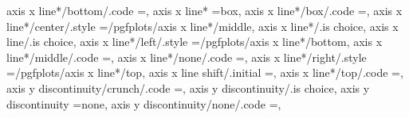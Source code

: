{{{{{{{{axis x line*/bottom/.code                                          ={\def\pgfplots@xaxislinesnum{1}\def\pgfplots@xtickposnum{1}\let\pgfplots@xticklabel@pos\pgfutil@empty},                            
axis x line*                                                       =box,                                                                                                                               
axis x line*/box/.code                                             ={\def\pgfplots@xaxislinesnum{0}\def\pgfplots@xtickposnum{0}},                                                                      
axis x line*/center/.style                                         ={/pgfplots/axis x line*/middle},                                                                                                   
axis x line*/.is choice,
axis x line/.is choice,
axis x line*/left/.style                                           ={/pgfplots/axis x line*/bottom},                                                                                                   
axis x line*/middle/.code                                          ={\def\pgfplots@xaxislinesnum{2}\def\pgfplots@xtickposnum{2}\let\pgfplots@xticklabel@pos\pgfutil@empty},                            
axis x line*/none/.code                                            ={\def\pgfplots@xaxislinesnum{4}\def\pgfplots@xtickposnum{4}\let\pgfplots@xticklabel@pos\pgfutil@empty},                            
axis x line*/right/.style                                          ={/pgfplots/axis x line*/top},                                                                                                      
axis x line shift/.initial                                         =,                                                                                                                                  
axis x line*/top/.code                                             ={\def\pgfplots@xaxislinesnum{3}\def\pgfplots@xtickposnum{3}\let\pgfplots@xticklabel@pos\pgfutil@empty},                            
axis y discontinuity/crunch/.code                                  ={\def\pgfplots@yaxisdiscontnum{1}},                                                                                                
axis y discontinuity/.is choice,
axis y discontinuity                                               =none,                                                                                                                              
axis y discontinuity/none/.code                                    ={\def\pgfplots@yaxisdiscontnum{0}},                                                                                                
}}}}}}}}
